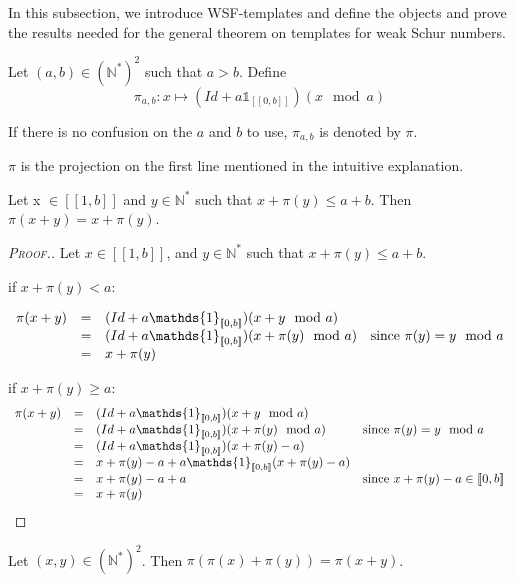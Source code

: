 \qquad In this subsection, we introduce WSF-templates and define the objects and prove the results needed
for the general theorem on templates for weak Schur numbers.

\begin{definition}

Let \((a,b) \in (\mathbb{N}^*)^2\) such that \(a>b\). Define
\[ \pi_{a,b}:x \longmapsto (Id+a\mathds{1}_{ [\![0,b]\!]})(x \mod a)\]
\end{definition}

If there is no confusion on the \(a\) and \(b\) to use, \(\pi_{a, b}\) is denoted by \(\pi\).

\(\pi\) is the projection on the first line mentioned in the intuitive explanation.

\begin{proposition}
Let x \(\in [\![1,b]\!]\) and \(y \in \mathbb{N}^*\) such that \(x+\pi(y) \leqslant a+b\). Then \(\pi(x+y)=x+\pi(y)\).
\end{proposition}

\begin{proof}[\textsc{Proof.}]
Let  \(x\in [\![1,b]\!]\), and  \(y\in \mathbb{N}^*\) such that \(x+\pi(y)\leqslant a+b\).

\noindent if \(x+\pi(y)< a \):

\[
\begin{array}{c c l l}
	\pi(x+y) & = & (Id+a\mathds{1}_{ [\![0,b]\!]})(x+y \mod a) & \\
	& = & (Id+a\mathds{1}_{ [\![0,b]\!]})(x+\pi(y) \mod a) & \text{since } \pi(y)=y \mod a \\
	& = & x+ \pi(y) &
\end{array}
\]

\noindent if \(x+\pi(y)\geqslant a\):
\[
\begin{array}{c c l l}
	\pi(x+y) & = & (Id+a\mathds{1}_{ [\![0,b]\!]})(x+y \mod a)& \\
	& = & (Id+a\mathds{1}_{ [\![0,b]\!]})(x+\pi(y)\mod a) & \text{since } \pi(y)=y \mod a \\
	& = & (Id+a\mathds{1}_{ [\![0,b]\!]})(x+\pi(y) - a) & \\
	& = & x+\pi(y) - a +a\mathds{1}_{ [\![0,b]\!]}(x+\pi(y) - a) & \\
	& = & x+\pi(y) - a +a & \text{since } x+\pi(y) - a \in [\![0,b]\!] \\
	& = & x+\pi(y) &
\end{array}
\]
\end{proof}


\begin{proposition}
Let \((x,y)\in (\mathbb{N}^*)^2\). Then \(\pi(\pi(x)+\pi(y))=\pi(x+y)\).
\end{proposition}

